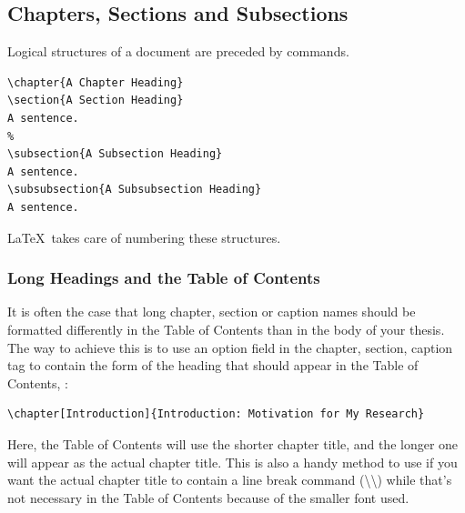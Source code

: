 \subsection{Chapters, Sections and Subsections}
Logical structures of a document are preceded by commands.
\begin{verbatim}
\chapter{A Chapter Heading}
\section{A Section Heading}
A sentence.
%
\subsection{A Subsection Heading}
A sentence.
\subsubsection{A Subsubsection Heading}
A sentence.
\end{verbatim}
\LaTeX\ takes care of numbering these structures.

\subsubsection{Long Headings and the Table of Contents}
It is often the case that long chapter, section or caption names should be
formatted differently in the Table of Contents than in the body of your thesis.
The way to achieve this is to use an option field in the chapter, section, caption tag to contain the form of the heading that should appear in the Table of Contents, \eg :
\begin{verbatim}
\chapter[Introduction]{Introduction: Motivation for My Research}
\end{verbatim}
Here, the Table of Contents will use the shorter chapter title, and the longer
one will appear as the actual chapter title. This is also a handy method to use
if you want the actual chapter title to contain a line break command (\textbackslash\textbackslash) while that's not necessary in the Table of Contents because of the smaller font used.

